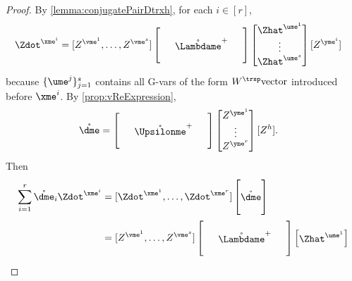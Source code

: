 \documentclass[main.tex]{subfiles}
\begin{document}
\begin{proof}
By \cref{lemma:conjugatePairDtrxh}, for each $i \in [r]$,
\begin{align*}
\Zdot^{\xme^i}
  &=  
    [Z^{\vme^1},
    \ldots,
     Z^{\vme^s}]
    \begin{bmatrix}
    \phz
      &\phz
        &\phz\\
    \phz
      &\mathring{\Lambdame }^+
        &\phz\\
    \phz
      &\phz
        &\phz
    \end{bmatrix}
    \begin{bmatrix}
    \Zhat^{\ume^1}\\
    \vdots\\
    \Zhat^{\ume^s}
    \end{bmatrix}
     [Z^{\yme^i}]
\end{align*}
because $\{\ume^j\}_{j=1}^s$ contains all G-vars of the form $W^\trsp\mathrm{vector}$ introduced before $\xme^i$.
By \cref{prop:vReExpression},
\begin{align*}
\mathring{\dme}
  &=
    \begin{bmatrix}
    \phz
      &\phz
        &\phz\\
    \phz
      &\mathring{\Upsilonme }^+
        &\phz\\
    \phz
      &\phz
        &\phz
    \end{bmatrix}
    \begin{bmatrix}
       Z^{\yme^1}\\
      \vdots\\
       Z^{\yme^r}
    \end{bmatrix}
       [Z^{h}]
      .
\end{align*}
Then
\begin{align*}
\sum_{i=1}^r \mathring{\dme}_i \Zdot^{\xme^i}
&=
  [\Zdot^{\xme^1}, \ldots, \Zdot^{\xme^r}]
  \begin{bmatrix}
    \phz\\
    \mathring{\dme}\\
    \phz
  \end{bmatrix}
  \\
&=
  [Z^{\vme^1},
  \ldots,
   Z^{\vme^s}]
  \begin{bmatrix}
  \phz
    &\phz
      &\phz\\
  \phz
    &\mathring{\Lambdame }^+
      &\phz\\
  \phz
    &\phz
      &\phz
  \end{bmatrix}
  \begin{bmatrix}
  \Zhat^{\ume^1}\\

\end{bmatrix}
\end{align*}
\end{proof}
\end{document}
